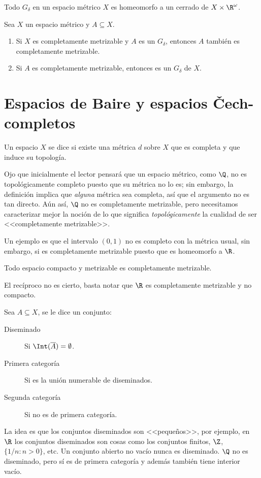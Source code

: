 \documentclass[topologia-analisis.tex]{subfiles}
\begin{document}
\begin{thm}
	Todo $G_\delta$ en un espacio métrico $X$ es homeomorfo a un cerrado de $X \times \R^\omega$.
\end{thm}
\begin{cor}\label{thm:Gd_sub_compl_is_compl}
	Sea $X$ un espacio métrico y $A \subseteq X$.
	\begin{enumerate}
		\item Si $X$ es completamente metrizable y $A$ es un $G_\delta$, entonces $A$ también es completamente metrizable.
		\item Si $A$ es completamente metrizable, entonces es un $G_\delta$ de $X$.
	\end{enumerate}
\end{cor}

\section{Espacios de Baire y espacios \v Cech-completos}\label{sec:cech_complete}
\begin{mydefi}
	Un espacio $X$ se dice  si existe una métrica $d$ sobre $X$ que es completa y que induce su topología.
\end{mydefi}
Ojo que inicialmente el lector pensará que un espacio métrico, como $\Q$, no es topológicamente completo puesto que su métrica no lo es;
sin embargo, la definición implica que \textit{alguna} métrica sea completa, así que el argumento no es tan directo.
Aún así, $\Q$ no es completamente metrizable, pero necesitamos caracterizar mejor la noción de lo que significa \textit{topológicamente}
la cualidad de ser <<completamente metrizable>>.

Un ejemplo es que el intervalo $(0, 1)$ no es completo con la métrica usual, sin embargo, si es completamente metrizable puesto que es homeomorfo a $\R$.

\begin{prop}
	Todo espacio compacto y metrizable es completamente metrizable.
\end{prop}
El recíproco no es cierto, basta notar que $\R$ es completamente metrizable y no compacto.

\begin{mydef}
	Sea $A \subseteq X$, se le dice un conjunto:
	\begin{description}
		\item[Diseminado] Si $\Int(\overline A) = \emptyset$.
		\item[Primera categoría] Si es la unión numerable de diseminados.
		\item[Segunda categoría] Si no es de primera categoría.
	\end{description}
\end{mydef}
La idea es que los conjuntos diseminados son <<pequeños>>, por ejemplo, en $\R$ los conjuntos diseminados son cosas como los conjuntos finitos,
$\Z$, $\{1/n : n>0\}$, etc. Un conjunto abierto no vacío nunca es diseminado.
$\Q$ no es diseminado, pero sí es de primera categoría y además también tiene interior vacío.
\end{document}
